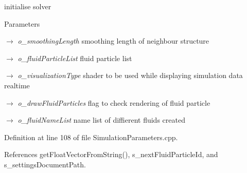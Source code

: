 initialise solver 


\begin{DoxyParams}{Parameters}
\item[\mbox{$\rightarrow$} {\em o\_\-smoothingLength}]smoothing length of neighbour structure \item[\mbox{$\rightarrow$} {\em o\_\-fluidParticleList}]fluid particle list \item[\mbox{$\rightarrow$} {\em o\_\-visualizationType}]shader to be used while displaying simulation data realtime \item[\mbox{$\rightarrow$} {\em o\_\-drawFluidParticles}]flag to check rendering of fluid particle \item[\mbox{$\rightarrow$} {\em o\_\-fluidNameList}]name list of diffierent fluids created \end{DoxyParams}


Definition at line 108 of file SimulationParameters.cpp.



References getFloatVectorFromString(), s\_\-nextFluidParticleId, and s\_\-settingsDocumentPath.




